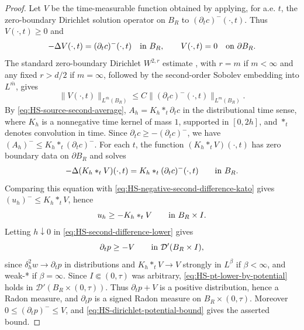 \documentclass[11pt]{amsart}
\numberwithin{equation}{section}
\numberwithin{figure}{section}
\theoremstyle{plain}
\theoremstyle{definition}
\theoremstyle{remark}
\theoremstyle{plain}
\newcommand{\norm}[1]{\lVert #1 \rVert}
\begin{document}
\begin{proof}
Let \(V\) be the time-measurable function obtained by applying, for a.e.
\(t\), the zero-boundary Dirichlet solution operator on \(B_R\) to
\((\partial_t c)^-(\cdot,t)\).  Thus \(V(\cdot,t)\geq0\) and
\[
    -\Delta V(\cdot,t)=(\partial_t c)^-(\cdot,t)
    \quad\hbox{in }B_R,
    \qquad
    V(\cdot,t)=0
    \quad\hbox{on }\partial B_R .
\]
The standard zero-boundary Dirichlet \(W^{2,r}\) estimate
\cite[Thm.~9.15 and Lem.~9.17]{GilTru}, with \(r= m\) if
\(m<\infty\) and any fixed \(r>d/2\) if \(m=\infty\), followed by
the second-order Sobolev embedding into \(L^{\bar m}\), gives
\begin{equation}\label{eq:HS-dirichlet-potential-bound}
    \norm{V(\cdot,t)}_{L^{\bar m}(B_R)}
    \leq
    C\norm{(\partial_t c)^-(\cdot,t)}_{L^m(B_R)} .
\end{equation}
By \eqref{eq:HS-source-second-average}, \(A_h=K_h*_t\partial_t c\) in the
distributional time sense, where \(K_h\) is a nonnegative time kernel of
mass \(1\), supported in \([0,2h]\), and $*_t$ denotes convolution in time.
Since \(\partial_t c\geq-(\partial_t c)^-\), we have
\((A_h)^-\leq K_h*_t(\partial_t c)^-\).  For each \(t\), the function
\((K_h*_tV)(\cdot,t)\) has zero boundary data on \(\partial B_R\) and solves
\[
    -\Delta (K_h*_tV)(\cdot,t)
    =K_h*_t(\partial_t c)^-(\cdot,t)
    \qquad\hbox{in }B_R.
\]
Comparing this equation with \eqref{eq:HS-negative-second-difference-kato}
gives \((u_h)^-\leq K_h*_tV\), hence
\begin{equation}\label{eq:HS-second-difference-lower}
    u_h\geq -K_h*_t V
    \qquad\hbox{in }B_R\times I.
\end{equation}
Letting \(h\downarrow0\) in \eqref{eq:HS-second-difference-lower} gives
\begin{equation}\label{eq:HS-pt-lower-by-potential}
    \partial_t p\geq -V
    \qquad\hbox{in }\mathcal D'(B_R\times I),
\end{equation}
since \(\delta_h^2w\to \partial_t p\) in distributions and \(K_h*_tV\to V\) strongly
in \(L^\beta\) if \(\beta<\infty\), and weak-* if \(\beta=\infty\).
Since \(I\Subset(0,\tau)\) was arbitrary, \eqref{eq:HS-pt-lower-by-potential}
holds in \(\mathcal D'(B_R\times(0,\tau))\).  Thus
\(\partial_t p+V\) is a positive distribution, hence a Radon measure, and \(\partial_t p\) is a
signed Radon measure on \(B_R\times(0,\tau)\).  Moreover
\(0\leq(\partial_t p)^-\leq V\), and
\eqref{eq:HS-dirichlet-potential-bound} gives the asserted bound.
\end{proof}
\end{document}
